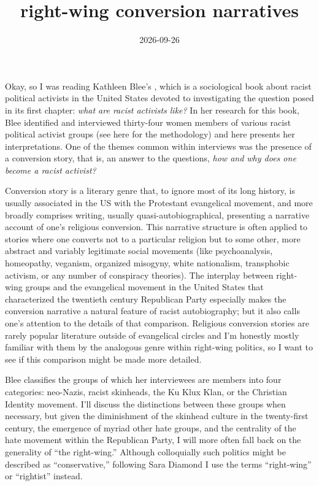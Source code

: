 \documentclass[11pt]{article}
\title{right-wing conversion narratives}
\date{2026-09-26}
\begin{document}
\maketitle

Okay, so I was reading Kathleen Blee's , which is a sociological book about racist political activists in the United States devoted to investigating the question posed in its first chapter: \textit{what are racist activists like?} In her research for this book, Blee identified and interviewed thirty-four women members of various racist political activist groups (see here\autocite[198]{Bl02} for the methodology) and here presents her interpretations. One of the themes common within interviews was the presence of a conversion story, that is, an answer to the questions, \textit{how and why does one become a racist activist?}

Conversion story is a literary genre that, to ignore most of its long history, is usually associated in the US with the Protestant evangelical movement, and more broadly comprises writing, usually quasi-autobiographical, presenting a narrative account of one's religious conversion. This narrative structure is often applied to stories where one converts not to a particular religion but to some other, more abstract and variably legitimate social movements (like psychoanalysis, homeopathy, veganism, organized misogyny, white nationalism, transphobic activism, or any number of conspiracy theories). The interplay between right-wing groups and the evangelical movement in the United States that characterized the twentieth century Republican Party especially makes the conversion narrative a natural feature of racist autobiography; but it also calls one's attention to the details of that comparison. Religious conversion stories are rarely popular literature outside of evangelical circles and I'm honestly mostly familiar with them by the analogous genre within right-wing politics, so I want to see if this comparison might be made more detailed. 

Blee classifies the groups of which her interviewees are members into four categories: neo-Nazis, racist skinheads, the Ku Klux Klan, or the Christian Identity movement. I'll discuss the distinctions between these groups when necessary, but given the diminishment of the skinhead culture in the twenty-first century, the emergence of myriad other hate groups, and the centrality of the hate movement within the Republican Party, I will more often fall back on the generality of ``the right-wing.'' Although colloquially such politics might be described as ``conservative,'' following Sara Diamond\autocite[6]{Di95} I use the terms ``right-wing'' or ``rightist'' instead.
\end{document}
